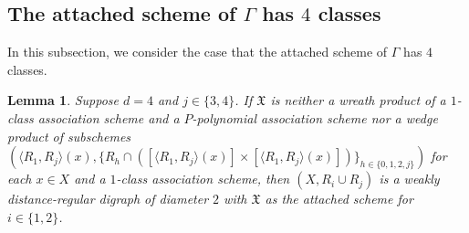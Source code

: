 \documentclass[12pt,a4paper]{amsart}
\newtheorem{lemma}[thm]{Lemma}
\theoremstyle{definition}
\begin{document}
\subsection{The attached scheme of $\Gamma$ has $4$ classes} In this subsection, we consider the case that the attached scheme of $\Gamma$ has $4$ classes.
\begin{lemma}\label{lem3.9}
Suppose $d=4$ and $j\in\{3,4\}$. If $\mathfrak{X}$ is neither a wreath product of a $1$-class association scheme and a $P$-polynomial association scheme nor a wedge product of subschemes $(\langle R_1,R_j\rangle(x),\{R_h\cap ([\langle R_1,R_j\rangle(x)]\times [\langle R_1,R_j\rangle(x)])\}_{h\in \{0,1,2,j\}})$ for each $x\in X$ and a $1$-class association scheme, then $(X,R_i\cup R_j)$ is a weakly distance-regular digraph of diameter $2$ with $\mathfrak{X}$ as the attached scheme for $i\in\{1,2\}$.
\end{lemma}
\end{document}
